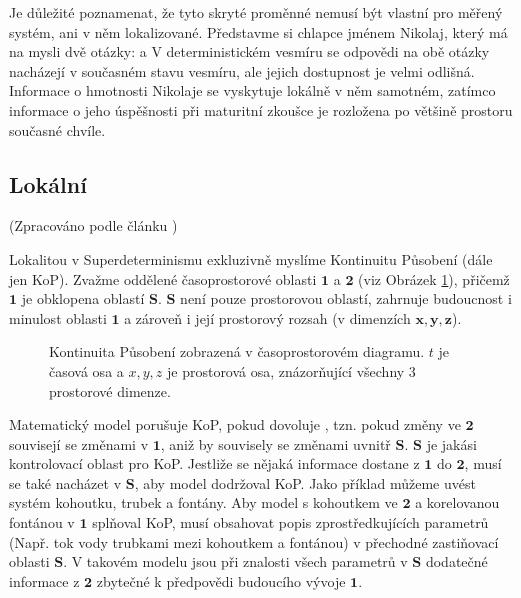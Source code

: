 Je důležité poznamenat, že tyto skryté proměnné nemusí být vlastní pro měřený systém, ani v něm lokalizované. Představme si chlapce jménem Nikolaj, který má na mysli dvě otázky:  a  V deterministickém vesmíru se odpovědi na obě otázky nacházejí v současném stavu vesmíru, ale jejich dostupnost je velmi odlišná. Informace o hmotnosti Nikolaje se vyskytuje lokálně v něm samotném, zatímco informace o jeho úspěšnosti při maturitní zkoušce je rozložena po většině prostoru současné chvíle.

\subsection{Lokální}
(Zpracováno podle článku \cite{CoA})

Lokalitou v Superdeterminismu exkluzivně myslíme Kontinuitu Působení (dále jen KoP). Zvažme oddělené časoprostorové oblasti $\bm{1}$ a $\bm{2}$ (viz Obrázek \ref{fig:7}), přičemž $\bm{1}$ je obklopena  oblastí $\bm{S}$. $\bm{S}$ není pouze prostorovou oblastí, zahrnuje budoucnost i minulost oblasti $\bm{1}$ a zároveň i její prostorový rozsah (v dimenzích $\bm{x,y,z}$).

\begin{figure}[ht]

    \centering

    \caption{\label{fig:7}Kontinuita Působení zobrazená v časoprostorovém diagramu. $t$ je časová osa a $x,y,z$ je prostorová osa, znázorňující všechny 3 prostorové dimenze.}
\end{figure}

Matematický model porušuje KoP, pokud dovoluje , tzn. pokud změny ve $\bm{2}$ souvisejí se změnami v $\bm{1}$, aniž by souvisely se změnami uvnitř $\bm{S}$. $\bm{S}$ je jakási kontrolovací oblast pro KoP. Jestliže se nějaká informace dostane z $\bm{1}$ do $\bm{2}$, musí se také nacházet v $\bm{S}$, aby model dodržoval KoP. Jako příklad můžeme uvést systém kohoutku, trubek a fontány. Aby model s kohoutkem ve $\bm{2}$ a korelovanou fontánou v $\bm{1}$ splňoval KoP, musí obsahovat popis zprostředkujících parametrů (Např. tok vody trubkami mezi kohoutkem a fontánou) v přechodné zastiňovací oblasti $\bm{S}$. V takovém modelu jsou při znalosti všech parametrů v $\bm{S}$ dodatečné informace z $\bm{2}$ zbytečné k předpovědi budoucího vývoje $\bm{1}$.

